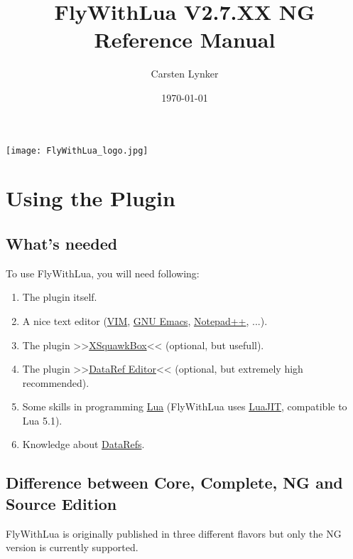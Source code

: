 \documentclass[11pt,parskip=half,a4paper]{scrartcl}
\begin{document}
\title{FlyWithLua V2.7.XX NG Reference Manual}
\author{Carsten Lynker}
\date{\today}

\maketitle
\vspace{2cm}

\begin{center}
\texttt{[image: FlyWithLua\_logo.jpg]}
\end{center}
\thispagestyle{empty}
\newpage
\verb||
\tableofcontents

\newpage
\section{Using the Plugin}
\subsection{What's needed}

To use FlyWithLua, you will need following:

\begin{enumerate}
\item The plugin itself.
\item A nice text editor (\href{http://www.vim.org/}{VIM}, \href{http://www.gnu.org/software/emacs/}{GNU Emacs}, \href{http://notepad-plus-plus.org/}{Notepad++}, ...).
\item The plugin >>\href{http://www.xsquawkbox.net/xsb/}{XSquawkBox}<< (optional, but usefull).
\item The plugin >>\href{http://wiki.x-plane.com/DataRefEditor}{DataRef Editor}<< (optional, but extremely high recommended).
\item Some skills in programming \href{http://www.lua.org}{Lua} (FlyWithLua uses \href{http://luajit.org/}{LuaJIT}, compatible to Lua 5.1).
\item Knowledge about \href{http://www.xsquawkbox.net/xpsdk/docs/DataRefs.html}{DataRefs}.
\end{enumerate}

\newpage
\subsection{Difference between Core, Complete, NG and Source Edition}

FlyWithLua is originally published in three different flavors but only the NG version is currently supported.
\end{document}
